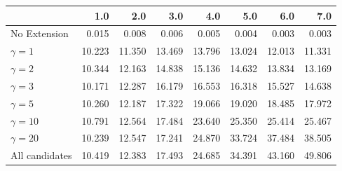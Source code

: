\begin{tabular}{lrrrrrrr}
\toprule
{} &    1.0 &    2.0 &    3.0 &    4.0 &    5.0 &    6.0 &    7.0 \\
\midrule
No Extension   &  0.015 &  0.008 &  0.006 &  0.005 &  0.004 &  0.003 &  0.003 \\
$\gamma = 1$   & 10.223 & 11.350 & 13.469 & 13.796 & 13.024 & 12.013 & 11.331 \\
$\gamma = 2$   & 10.344 & 12.163 & 14.838 & 15.136 & 14.632 & 13.834 & 13.169 \\
$\gamma = 3$   & 10.171 & 12.287 & 16.179 & 16.553 & 16.318 & 15.527 & 14.638 \\
$\gamma = 5$   & 10.260 & 12.187 & 17.322 & 19.066 & 19.020 & 18.485 & 17.972 \\
$\gamma = 10$  & 10.791 & 12.564 & 17.484 & 23.640 & 25.350 & 25.414 & 25.467 \\
$\gamma = 20$  & 10.239 & 12.547 & 17.241 & 24.870 & 33.724 & 37.484 & 38.505 \\
All candidates & 10.419 & 12.383 & 17.493 & 24.685 & 34.391 & 43.160 & 49.806 \\
\bottomrule
\end{tabular}
